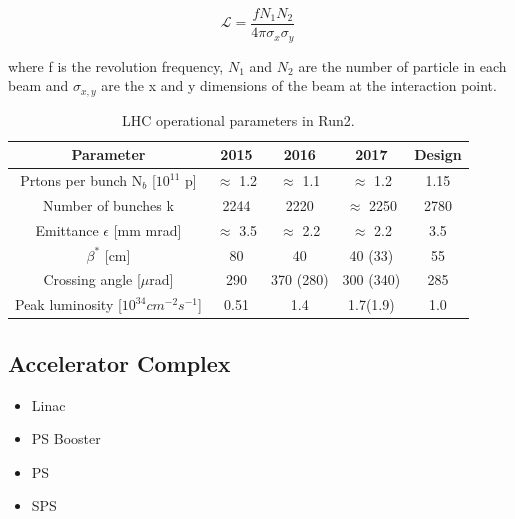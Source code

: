 \begin{equation}
\mathcal{L}=\frac{f N_1 N_2}{4 \pi \sigma_x \sigma_y} \;
\label{eq:cern:lumi}
\end{equation}

where f is the revolution frequency, $N_1$ and $N_2$ are the number of particle in each beam and $\sigma_{x,y}$  are the x and y dimensions of the beam at the interaction point.

\begin{table}[ht]
\begin{center}
\begin{tabular}{c c c c c }
\hline 
Parameter & 2015 & 2016 & 2017 & Design \\ 
\hline 
\hline
Prtons per bunch N$_b$ [$10^11$ p] & $\approx$ 1.2 & $\approx$ 1.1 & $\approx$ 1.2 & 1.15 \\ 
\hline 
Number of bunches k & 2244 & 2220 & $\approx$ 2250 & 2780 \\ 
\hline 
Emittance $\epsilon$ [mm mrad] & $\approx$ 3.5 & $\approx$ 2.2 & $\approx$ 2.2 & 3.5 \\ 
\hline 
$\beta^*$ [cm] & 80 & 40 & 40 (33) & 55 \\
\hline
Crossing angle [$\mu$rad] & 290 & 370 (280) & 300 (340) & 285 \\
\hline
Peak luminosity [$10^{34} cm^{-2}s^{-1}$] & 0.51 & 1.4 & 1.7(1.9) & 1.0 \\
\hline
\end{tabular}
\end{center}
\caption{LHC operational parameters in Run2.}
\label{tab:lhc:param}
\end{table}



\subsection{Accelerator Complex}

\begin{itemize}
\item Linac
\item PS Booster
\item PS
\item SPS
\end{itemize}

